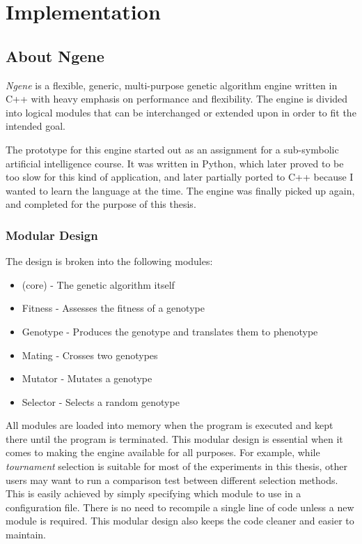\section{Implementation}

\subsection{About Ngene}
\emph{Ngene} is a flexible, generic, multi-purpose genetic algorithm engine written in C++ with heavy emphasis on performance and flexibility. The engine is divided into logical modules that can be interchanged or extended upon in order to fit the intended goal.

The prototype for this engine started out as an assignment for a sub-symbolic artificial intelligence course. It was written in Python, which later proved to be too slow for this kind of application, and later partially ported to C++ because I wanted to learn the language at the time. The engine was finally picked up again, and completed for the purpose of this thesis.

\subsubsection{Modular Design}
The design is broken into the following modules:

\begin{itemize}
	\itemsep=0pt
	\item (core) - The genetic algorithm itself
	\item Fitness - Assesses the fitness of a genotype
	\item Genotype - Produces the genotype and translates them to phenotype
	\item Mating - Crosses two genotypes
	\item Mutator - Mutates a genotype
	\item Selector - Selects a random genotype
\end{itemize}

All modules are loaded into memory when the program is executed and kept there until the program is terminated. This modular design is essential when it comes to making the engine available for all purposes. For example, while \emph{tournament} selection is suitable for most of the experiments in this thesis, other users may want to run a comparison test between different selection methods. This is easily achieved by simply specifying which module to use in a configuration file. There is no need to recompile a single line of code unless a new module is required. This modular design also keeps the code cleaner and easier to maintain.

